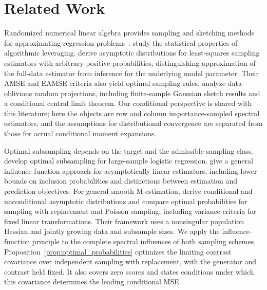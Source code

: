\documentclass[pdflatex,iicol,sn-mathphys-ay]{sn-jnl}
\theoremstyle{thmstyleone}
\theoremstyle{thmstylethree}
\theoremstyle{thmstyletwo}
\begin{document}
\section{Related Work}
\label{sec:literature}

Randomized numerical linear algebra provides sampling and sketching methods
for approximating regression problems~\citep{drineas2006sampling,woodruff2014sketching}.
\citet{ma2015statistical} study the statistical properties of
algorithmic leveraging. \citet{ma2022asymptotic} derive asymptotic
distributions for least-squares sampling estimators with arbitrary positive
probabilities, distinguishing approximation of the full-data estimator from
inference for the underlying model parameter. Their AMSE and EAMSE criteria
also yield optimal sampling rules. \citet{ahfock2021statistical}
analyze data-oblivious random projections, including finite-sample Gaussian
sketch results and a conditional central limit theorem. Our conditional
perspective is shared with this literature; here the objects are row and
column importance-sampled spectral estimators, and the assumptions for
distributional convergence are separated from those for actual conditional
moment expansions.

Optimal subsampling depends on the target and the admissible sampling class.
\citet{wang2019information} develop optimal subsampling for
large-sample logistic regression. \citet{ting2018optimal}
give a general influence-function approach for asymptotically linear
estimators, including lower bounds on inclusion probabilities and distinctions
between estimation and prediction objectives. For general smooth
M-estimation, \citet{wang2022replacement} derive conditional and unconditional
asymptotic distributions and compare optimal probabilities for sampling with
replacement and Poisson sampling, including variance criteria for fixed
linear transformations. Their framework uses a nonsingular population Hessian
and jointly growing data and subsample sizes. We apply the influence-function
principle to the complete spectral influences of both sampling schemes.
Proposition~\ref{prop:optimal_probabilities} optimizes the limiting contrast
covariance over independent sampling with replacement, with the generator
and contrast held fixed. It also covers zero scores and states conditions
under which this covariance determines the leading conditional MSE.
\end{document}
